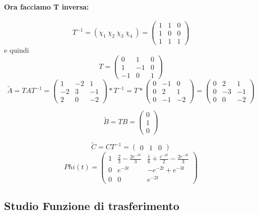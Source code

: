 \documentclass{article}
\begin{document}
\paragraph{Ora facciamo T inversa:} \[ T^{-1} = (\chi_1\ \chi_2\ \chi_3\ \chi_4\ ) = \left(\begin{matrix}1 & 1 & 0\\1 & 0 & 0\\1 & 1 & 1\end{matrix}\right) \]
e quindi \[T = \left(\begin{matrix}0 & 1 & 0\\1 & -1 & 0\\-1 & 0 & 1\end{matrix}\right)\]
\[ \widetilde{A} = TAT^{-1} = \left(\begin{matrix}1 & -2 & 1\\-2 & 3 & -1\\2 & 0 & -2\end{matrix}\right) * T^{-1} = T*\left(\begin{matrix}0 & -1 & 0\\0 & 2 & 1\\0 & -1 & -2\end{matrix}\right) =\left(\begin{matrix}0 & 2 & 1\\0 & -3 & -1\\0 & 0 & -2\end{matrix}\right) \]

\[ \widetilde{B} = T B = \left(\begin{matrix}0\\1\\0\end{matrix}\right) \]

\[ \widetilde{C} = C T^{-1} = \left(\begin{matrix}0 & 1 & 0\end{matrix}\right) \]
\[Phi(t) = \left(\begin{matrix}1 & \frac{2}{3} - \frac{2 e^{- 3 t}}{3} & \frac{1}{6} + \frac{e^{- 2 t}}{2} - \frac{2 e^{- 3 t}}{3}\\0 & e^{- 3 t} & - e^{- 2 t} + e^{- 3 t}\\0 & 0 & e^{- 2 t}\end{matrix}\right) \]

\subsection{Studio Funzione di trasferimento}
\end{document}
